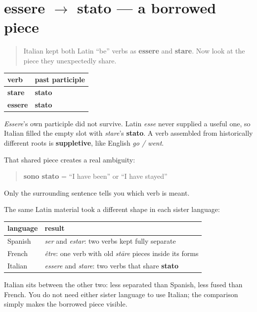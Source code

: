 \section[essere to stato]{essere $\to$ stato — a borrowed piece}

\label{lesson:IT-C16-essere-stato}



\begin{quote}
Italian kept both Latin “be” verbs as \textbf{essere} and \textbf{stare}. Now look at the piece they unexpectedly share.
\end{quote}

\begin{grammarlens}[title={Grammar Lens: one participle for two verbs}]
\noindent
\begin{tabularx}{\linewidth}{@{}>{\raggedright\arraybackslash}X>{\raggedright\arraybackslash}X@{}}
\toprule
\textbf{verb} & \textbf{past participle} \\
\midrule
\textbf{stare} & \textbf{stato} \\
\textbf{essere} & \textbf{stato} \\
\bottomrule
\end{tabularx}

\emph{Essere}’s own participle did not survive. Latin \emph{esse} never supplied a useful one, so Italian filled the empty slot with \emph{stare}’s \textbf{stato}. A verb assembled from historically different roots is \textbf{suppletive}, like English \emph{go / went}.

That shared piece creates a real ambiguity:

\begin{quote}
\textbf{sono stato} = “I have been” or “I have stayed”
\end{quote}

Only the surrounding sentence tells you which verb is meant.
\end{grammarlens}

\begin{grammarlens}[title={What you've built: three Romance solutions}]
The same Latin material took a different shape in each sister language:

\noindent
\begin{tabularx}{\linewidth}{@{}>{\raggedright\arraybackslash}X>{\raggedright\arraybackslash}X@{}}
\toprule
\textbf{language} & \textbf{result} \\
\midrule
Spanish & \emph{ser} and \emph{estar}: two verbs kept fully separate \\
French & \emph{être}: one verb with old \emph{stāre} pieces inside its forms \\
Italian & \emph{essere} and \emph{stare}: two verbs that share \textbf{stato} \\
\bottomrule
\end{tabularx}

Italian sits between the other two: less separated than Spanish, less fused than French. You do not need either sister language to use Italian; the comparison simply makes the borrowed piece visible.
\end{grammarlens}

